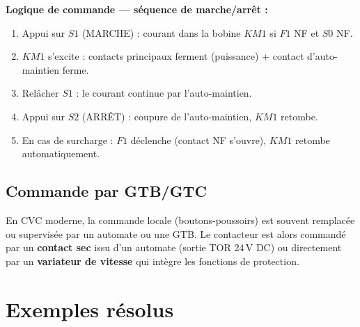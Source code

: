 \begin{methode}
  \textbf{Logique de commande — séquence de marche/arrêt :}
  \begin{enumerate}
    \item Appui sur $S1$ (MARCHE) : courant dans la bobine $KM1$ si $F1$ NF et $S0$ NF.
    \item $KM1$ s'excite : contacts principaux ferment (puissance) + contact d'auto-maintien ferme.
    \item Relâcher $S1$ : le courant continue par l'auto-maintien.
    \item Appui sur $S2$ (ARRÊT) : coupure de l'auto-maintien, $KM1$ retombe.
    \item En cas de surcharge : $F1$ déclenche (contact NF s'ouvre), $KM1$ retombe automatiquement.
  \end{enumerate}
\end{methode}

\subsection{Commande par GTB/GTC}

En CVC moderne, la commande locale (boutons-poussoirs) est souvent remplacée ou supervisée par un automate ou une GTB. Le contacteur est alors commandé par un \textbf{contact sec} issu d'un automate (sortie TOR 24\,V DC) ou directement par un \textbf{variateur de vitesse} qui intègre les fonctions de protection.

\section{Exemples résolus}

